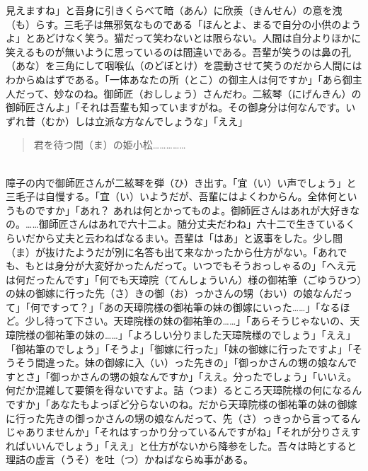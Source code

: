 \documentclass{book}
\begin{document}
見えますね」と吾身に引きくらべて暗（あん）に欣羨（きんせん）の意を洩（も）らす。三毛子は無邪気なものである「ほんとよ、まるで自分の小供のようよ」とあどけなく笑う。猫だって笑わないとは限らない。人間は自分よりほかに笑えるものが無いように思っているのは間違いである。吾輩が笑うのは鼻の孔（あな）を三角にして咽喉仏（のどぼとけ）を震動させて笑うのだから人間にはわからぬはずである。「一体あなたの所（とこ）の御主人は何ですか」「あら御主人だって、妙なのね。御師匠（おししょう）さんだわ。二絃琴（にげんきん）の御師匠さんよ」「それは吾輩も知っていますがね。その御身分は何なんです。いずれ昔（むか）しは立派な方なんでしょうな」「ええ」\\
\blockquote{君を待つ間（ま）の姫小松\ldots{}\ldots{}\ldots{}\ldots{}\ldots{}}\\
障子の内で御師匠さんが二絃琴を弾（ひ）き出す。「宜（い）い声でしょう」と三毛子は自慢する。「宜（い）いようだが、吾輩にはよくわからん。全体何というものですか」「あれ？ あれは何とかってものよ。御師匠さんはあれが大好きなの。\ldots{}\ldots{}御師匠さんはあれで六十二よ。随分丈夫だわね」六十二で生きているくらいだから丈夫と云わねばなるまい。吾輩は「はあ」と返事をした。少し間（ま）が抜けたようだが別に名答も出て来なかったから仕方がない。「あれでも、もとは身分が大変好かったんだって。いつでもそうおっしゃるの」「へえ元は何だったんです」「何でも天璋院（てんしょういん）様の御祐筆（ごゆうひつ）の妹の御嫁に行った先（さ）きの御（お）っかさんの甥（おい）の娘なんだって」「何ですって？」「あの天璋院様の御祐筆の妹の御嫁にいった\ldots{}\ldots{}」「なるほど。少し待って下さい。天璋院様の妹の御祐筆の\ldots{}\ldots{}」「あらそうじゃないの、天璋院様の御祐筆の妹の\ldots{}\ldots{}」「よろしい分りました天璋院様のでしょう」「ええ」「御祐筆のでしょう」「そうよ」「御嫁に行った」「妹の御嫁に行ったですよ」「そうそう間違った。妹の御嫁に入（い）った先きの」「御っかさんの甥の娘なんですとさ」「御っかさんの甥の娘なんですか」「ええ。分ったでしょう」「いいえ。何だか混雑して要領を得ないですよ。詰（つま）るところ天璋院様の何になるんですか」「あなたもよっぽど分らないのね。だから天璋院様の御祐筆の妹の御嫁に行った先きの御っかさんの甥の娘なんだって、先（さ）っきっから言ってるんじゃありませんか」「それはすっかり分っているんですがね」「それが分りさえすればいいんでしょう」「ええ」と仕方がないから降参をした。吾々は時とすると理詰の虚言（うそ）を吐（つ）かねばならぬ事がある。\\
\end{document}
